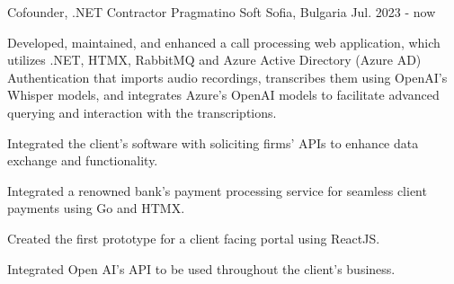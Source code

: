 

\begin{cventries}

  \cventry
    {Cofounder, .NET Contractor} %
    {Pragmatino Soft} %
    {Sofia, Bulgaria} %
    {Jul. 2023 - now} %
    {
      \begin{cvitems} %
        \item {Developed, maintained, and enhanced a call processing web application, which utilizes .NET, HTMX, RabbitMQ and Azure Active Directory (Azure AD) Authentication that imports audio recordings, transcribes them using OpenAI's Whisper models, and integrates Azure's OpenAI models to facilitate advanced querying and interaction with the transcriptions. }
        \vspace{0.7em} %
         \item {Integrated the client's software with soliciting firms' APIs to enhance data exchange and functionality. }
         \vspace{0.7em} %
        \item {Integrated a renowned bank's payment processing service for seamless client payments using Go and HTMX. }
        \vspace{0.7em} %
        \item {Created the first prototype for a client facing portal using ReactJS. }
        \vspace{0.7em} %
        \item {Integrated Open AI's API to be used throughout the client's business. }
      \end{cvitems}
    }


\end{cventries}
